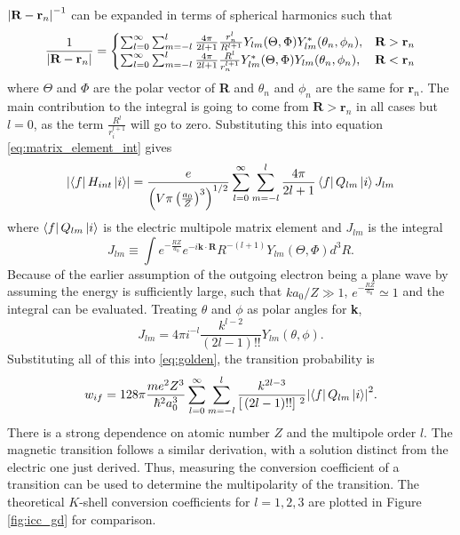 $\abs{\textbf{R}-\textbf{r}_n}^{-1}$ can be expanded in terms of spherical harmonics such that
\begin{equation}
\label{eq:expansion_Rri}
\frac{1}{\abs{\textbf{R}-\textbf{r}_n}} = \begin{cases}
    \sum_{l=0}^\infty\sum_{m=-l}^{l}\frac{4\pi}{2l+1}\frac{r_n^l}{R^{l+1}}Y_{lm}(\Theta,\Phi)Y_{lm}^{*}(\theta_n,\phi_n), & \textbf{R}>\textbf{r}_n \\
    \sum_{l=0}^\infty\sum_{m=-l}^{l}\frac{4\pi}{2l+1}\frac{R^l}{r_n^{l+1}}Y_{lm}^{*}(\Theta,\Phi)Y_{lm}(\theta_n,\phi_n), & \textbf{R}<\textbf{r}_n
\end{cases}
\end{equation}
where $\Theta$ and $\Phi$ are the polar vector of \textbf{R} and $\theta_n$ and $\phi_n$ are the same for $\textbf{r}_n$. The main contribution to the integral is going to come from $\textbf{R}>\textbf{r}_n$ in all cases but $l=0$, as the term $\frac{R^l}{r_i^{l+1}}$ will go to zero. Substituting this into equation \ref{eq:matrix_element_int} gives
\begin{equation}
    \abs{\bra{f}H_{int}\ket{i}} = \frac{e}{ \left(V\pi\left(\frac{a_0}{Z}\right)^3\right)^{1/2}} \sum_{l=0}^\infty\sum_{m=-l}^{l}\frac{4\pi}{2l+1} \bra{f}Q_{lm}\ket{i}J_{lm}
\end{equation}
where $\bra{f}Q_{lm}\ket{i}$ is the electric multipole matrix element and $J_{lm}$ is the integral
\begin{equation}
    J_{lm}\equiv\int e^{-\frac{RZ}{a_0}}e^{-i\textbf{k}\cdot\textbf{R}}R^{-(l+1)}Y_{lm}(\Theta,\Phi)d^3R.
\end{equation}
Because of the earlier assumption of the outgoing electron being a plane wave by assuming the energy is sufficiently large, such that $ka_0/Z\gg1$, $e^{-\frac{RZ}{a_0}}\simeq1$ and the integral can be evaluated. Treating $\theta$ and $\phi$ as polar angles for \textbf{k}, 
\begin{equation}
    J_{lm}=4\pi i^{-l}\frac{k^{l-2}}{(2l-1)!!}Y_{lm}(\theta,\phi).
\end{equation}
Substituting all of this into \ref{eq:golden}, the transition probability is
\begin{equation}
    w_{if}=128\pi\frac{me^2Z^3}{\hbar^2a_0^3} \sum_{l=0}^\infty\sum_{m=-l}^{l} \frac{k^{2l-3}}{\left[\,(2l-1)!!\right]\,^2}\abs{\bra{f}Q_{lm}\ket{i}}^2.
\end{equation}
There is a strong dependence on atomic number $Z$ and the multipole order $l$. The magnetic transition follows a similar derivation, with a solution distinct from the electric one just derived. Thus, measuring the conversion coefficient of a transition can be used to determine the multipolarity of the transition. The theoretical $K$-shell conversion coefficients for $l=1,2,3$ are plotted in Figure \ref{fig:icc_gd} for comparison.

